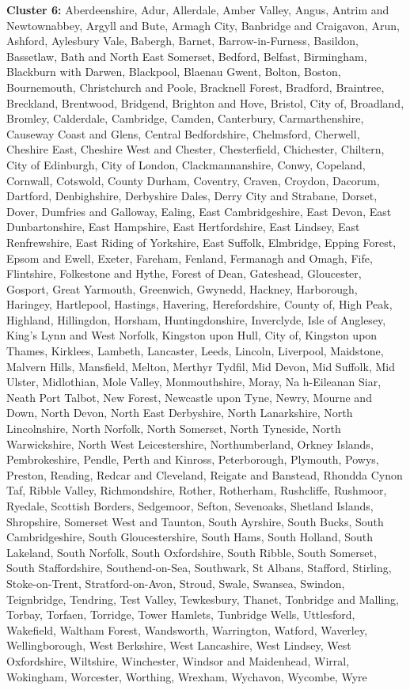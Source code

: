 \documentclass[]{interact}
\theoremstyle{plain}%
\theoremstyle{definition}
\theoremstyle{remark}
\begin{document}
\textbf{Cluster 6: } Aberdeenshire, Adur, Allerdale, Amber Valley,
Angus, Antrim and Newtownabbey, Argyll and Bute, Armagh City, Banbridge
and Craigavon, Arun, Ashford, Aylesbury Vale, Babergh, Barnet,
Barrow-in-Furness, Basildon, Bassetlaw, Bath and North East Somerset,
Bedford, Belfast, Birmingham, Blackburn with Darwen, Blackpool, Blaenau
Gwent, Bolton, Boston, Bournemouth, Christchurch and Poole, Bracknell
Forest, Bradford, Braintree, Breckland, Brentwood, Bridgend, Brighton
and Hove, Bristol, City of, Broadland, Bromley, Calderdale, Cambridge,
Camden, Canterbury, Carmarthenshire, Causeway Coast and Glens, Central
Bedfordshire, Chelmsford, Cherwell, Cheshire East, Cheshire West and
Chester, Chesterfield, Chichester, Chiltern, City of Edinburgh, City of
London, Clackmannanshire, Conwy, Copeland, Cornwall, Cotswold, County
Durham, Coventry, Craven, Croydon, Dacorum, Dartford, Denbighshire,
Derbyshire Dales, Derry City and Strabane, Dorset, Dover, Dumfries and
Galloway, Ealing, East Cambridgeshire, East Devon, East Dunbartonshire,
East Hampshire, East Hertfordshire, East Lindsey, East Renfrewshire,
East Riding of Yorkshire, East Suffolk, Elmbridge, Epping Forest, Epsom
and Ewell, Exeter, Fareham, Fenland, Fermanagh and Omagh, Fife,
Flintshire, Folkestone and Hythe, Forest of Dean, Gateshead, Gloucester,
Gosport, Great Yarmouth, Greenwich, Gwynedd, Hackney, Harborough,
Haringey, Hartlepool, Hastings, Havering, Herefordshire, County of, High
Peak, Highland, Hillingdon, Horsham, Huntingdonshire, Inverclyde, Isle
of Anglesey, King's Lynn and West Norfolk, Kingston upon Hull, City of,
Kingston upon Thames, Kirklees, Lambeth, Lancaster, Leeds, Lincoln,
Liverpool, Maidstone, Malvern Hills, Mansfield, Melton, Merthyr Tydfil,
Mid Devon, Mid Suffolk, Mid Ulster, Midlothian, Mole Valley,
Monmouthshire, Moray, Na h-Eileanan Siar, Neath Port Talbot, New Forest,
Newcastle upon Tyne, Newry, Mourne and Down, North Devon, North East
Derbyshire, North Lanarkshire, North Lincolnshire, North Norfolk, North
Somerset, North Tyneside, North Warwickshire, North West Leicestershire,
Northumberland, Orkney Islands, Pembrokeshire, Pendle, Perth and
Kinross, Peterborough, Plymouth, Powys, Preston, Reading, Redcar and
Cleveland, Reigate and Banstead, Rhondda Cynon Taf, Ribble Valley,
Richmondshire, Rother, Rotherham, Rushcliffe, Rushmoor, Ryedale,
Scottish Borders, Sedgemoor, Sefton, Sevenoaks, Shetland Islands,
Shropshire, Somerset West and Taunton, South Ayrshire, South Bucks,
South Cambridgeshire, South Gloucestershire, South Hams, South Holland,
South Lakeland, South Norfolk, South Oxfordshire, South Ribble, South
Somerset, South Staffordshire, Southend-on-Sea, Southwark, St Albans,
Stafford, Stirling, Stoke-on-Trent, Stratford-on-Avon, Stroud, Swale,
Swansea, Swindon, Teignbridge, Tendring, Test Valley, Tewkesbury,
Thanet, Tonbridge and Malling, Torbay, Torfaen, Torridge, Tower Hamlets,
Tunbridge Wells, Uttlesford, Wakefield, Waltham Forest, Wandsworth,
Warrington, Watford, Waverley, Wellingborough, West Berkshire, West
Lancashire, West Lindsey, West Oxfordshire, Wiltshire, Winchester,
Windsor and Maidenhead, Wirral, Wokingham, Worcester, Worthing, Wrexham,
Wychavon, Wycombe, Wyre
\end{document}
